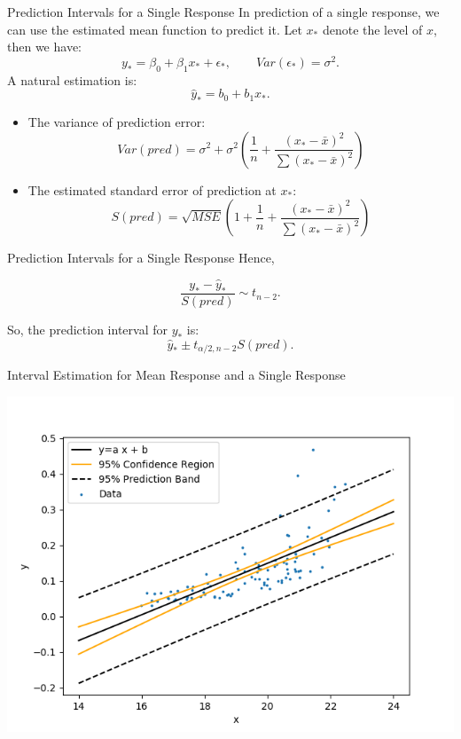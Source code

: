 \documentclass[
  ignorenonframetext,
]{beamer}
\providecommand{\tightlist}{%
  \setlength{\itemsep}{0pt}\setlength{\parskip}{0pt}}
\begin{document}
\begin{frame}{Prediction Intervals for a Single Response}
\protect\hypertarget{prediction-intervals-for-a-single-response}{}
In prediction of a single response, we can use the estimated mean
function to predict it. Let \(x_*\) denote the level of \(x\), then we
have:
\[ y_*=\beta_0+\beta_1x_*+\epsilon_*, \quad \quad Var(\epsilon_*)=\sigma^2.\]
A natural estimation is: \[ \hat{y}_*=b_0+b_1x_*.\]

\begin{itemize}
\tightlist
\item
  The variance of prediction error:
  \[ Var(pred)=\sigma^2+\sigma^2\left(\frac{1}{n}+\frac{(x_* -\bar{x})^2}{\sum (x_* -\bar{x})^2}\right)\]
\item
  The estimated standard error of prediction at \(x_*\):
  \[S(pred)=\sqrt{MSE}\left(1+\frac{1}{n}+\frac{(x_* -\bar{x})^2}{\sum (x_* -\bar{x})^2}\right)\]
\end{itemize}
\end{frame}

\begin{frame}{Prediction Intervals for a Single Response}
\protect\hypertarget{prediction-intervals-for-a-single-response-1}{}
Hence,

\[\frac{y_*-\hat{y}_*}{S(pred)}\sim t_{n-2}.\]

So, the prediction interval for \(y_*\) is:
\[\hat{y}_*\pm t_{\alpha/2, n-2}S(pred).\]
\end{frame}

\begin{frame}{Interval Estimation for Mean Response and a Single
Response}
\protect\hypertarget{interval-estimation-for-mean-response-and-a-single-response-1}{}
\small

\begin{center}\includegraphics[width=0.8\linewidth,height=0.6\textheight]{CI_PI} \end{center}
\normalsize
\end{frame}
\end{document}

